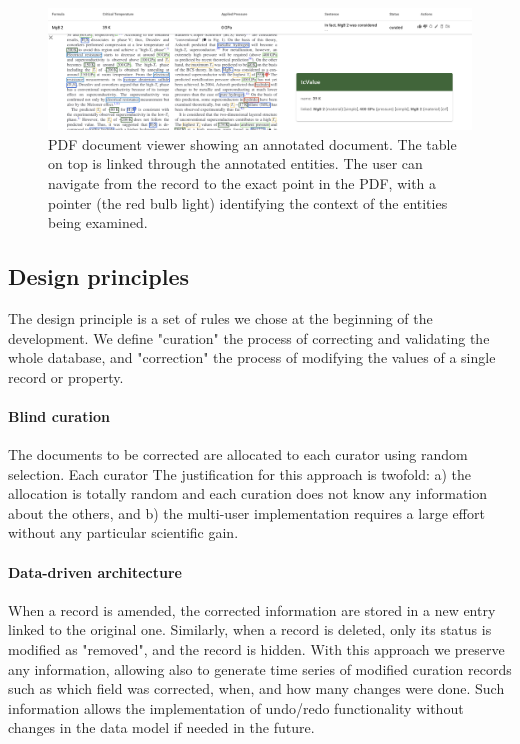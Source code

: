 \documentclass[a4paper]{article}
\begin{document}
\begin{figure}[ht]
  \centering
  \includegraphics[width=1\textwidth]{images/pdf-view-context.png} 
  \caption{PDF document viewer showing an annotated document. The table on top is linked through the annotated entities. The user can navigate from the record to the exact point in the PDF, with a pointer (the red bulb light) identifying the context of the entities being examined. }
  \label{fig:pdf-view}
\end{figure}


\subsection{Design principles}
\label{subsec:design-principles}
The design principle is a set of rules we chose at the beginning of the development. 
We define "curation" the process of correcting and validating the whole database, and "correction" the process of modifying the values of a single record or property. 

\paragraph{Blind curation}
The documents to be corrected are allocated to each curator using random selection. 
Each curator 
The justification for this approach is twofold: a) the allocation is totally random and each curation does not know any information about the others, and b) the multi-user implementation requires a large effort without any particular scientific gain. 

\paragraph{Data-driven architecture} When a record is amended, the corrected information are stored in a new entry linked to the original one. 
Similarly, when a record is deleted, only its status is modified as "removed", and the record is hidden. 
With this approach we preserve any information, allowing also to generate time series of modified curation records such as which field was corrected, when, and how many changes were done. 
Such information allows the implementation of undo/redo functionality without changes in the data model if needed in the future. 
\end{document}
